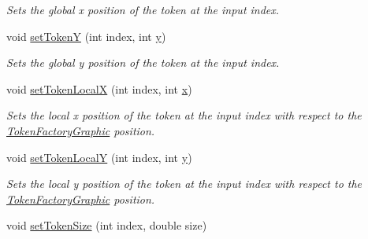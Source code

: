 \begin{DoxyCompactItemize}
\begin{DoxyCompactList}\small\item\em Sets the global x position of the token at the input index. \end{DoxyCompactList}\item 
\hypertarget{class_picto_1_1_token_factory_graphic_af1b2b05d650a17e4b52f1ed5bc164cef}{void \hyperlink{class_picto_1_1_token_factory_graphic_af1b2b05d650a17e4b52f1ed5bc164cef}{set\-Token\-Y} (int index, int \hyperlink{struct_picto_1_1_visual_element_a9a4db3430219e1f78208eda1a89e9f38}{y})}\label{class_picto_1_1_token_factory_graphic_af1b2b05d650a17e4b52f1ed5bc164cef}

\begin{DoxyCompactList}\small\item\em Sets the global y position of the token at the input index. \end{DoxyCompactList}\item 
\hypertarget{class_picto_1_1_token_factory_graphic_ab6c4a19632e3bf47d261f2146521bcf0}{void \hyperlink{class_picto_1_1_token_factory_graphic_ab6c4a19632e3bf47d261f2146521bcf0}{set\-Token\-Local\-X} (int index, int \hyperlink{struct_picto_1_1_visual_element_a1b50bc5fa41868f661687015be3c97e8}{x})}\label{class_picto_1_1_token_factory_graphic_ab6c4a19632e3bf47d261f2146521bcf0}

\begin{DoxyCompactList}\small\item\em Sets the local x position of the token at the input index with respect to the \hyperlink{class_picto_1_1_token_factory_graphic}{Token\-Factory\-Graphic} position. \end{DoxyCompactList}\item 
\hypertarget{class_picto_1_1_token_factory_graphic_a1110dfc00d814762e45e7f042b9e55d2}{void \hyperlink{class_picto_1_1_token_factory_graphic_a1110dfc00d814762e45e7f042b9e55d2}{set\-Token\-Local\-Y} (int index, int \hyperlink{struct_picto_1_1_visual_element_a9a4db3430219e1f78208eda1a89e9f38}{y})}\label{class_picto_1_1_token_factory_graphic_a1110dfc00d814762e45e7f042b9e55d2}

\begin{DoxyCompactList}\small\item\em Sets the local y position of the token at the input index with respect to the \hyperlink{class_picto_1_1_token_factory_graphic}{Token\-Factory\-Graphic} position. \end{DoxyCompactList}\item 
\hypertarget{class_picto_1_1_token_factory_graphic_a1e63cc7b4a436dc77a1ea29a5d3875a5}{void \hyperlink{class_picto_1_1_token_factory_graphic_a1e63cc7b4a436dc77a1ea29a5d3875a5}{set\-Token\-Size} (int index, double size)}\label{class_picto_1_1_token_factory_graphic_a1e63cc7b4a436dc77a1ea29a5d3875a5}


\end{DoxyCompactItemize}
